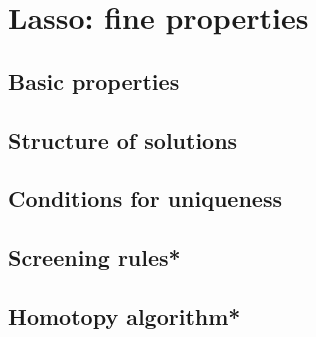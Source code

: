 \chapter{Lasso: fine properties}
\label{chap:lasso}


\section{Basic properties}

\section{Structure of solutions}
\label{sec:lasso_structure}


\section{Conditions for uniqueness}

\section{Screening rules*}

\section{Homotopy algorithm*}


